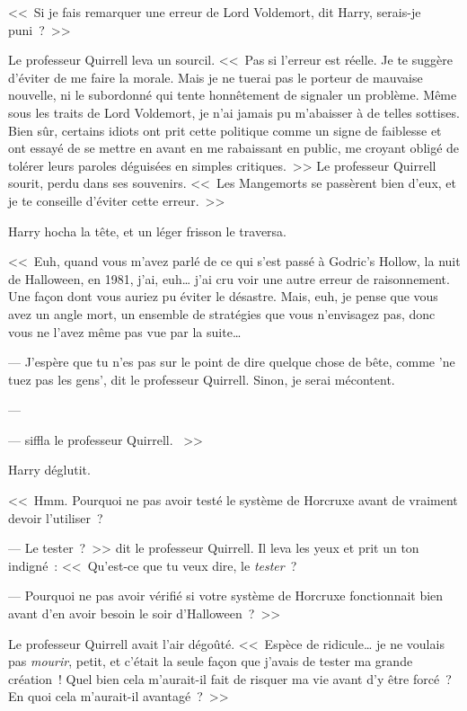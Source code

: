 <<~Si je fais remarquer une erreur de Lord Voldemort, dit Harry, serais-je puni~?~>>

Le professeur Quirrell leva un sourcil. <<~Pas si l'erreur est réelle. Je te suggère d'éviter de me faire la morale. Mais je ne tuerai pas le porteur de mauvaise nouvelle, ni le subordonné qui tente honnêtement de signaler un problème. Même sous les traits de Lord Voldemort, je n'ai jamais pu m'abaisser à de telles sottises. Bien sûr, certains idiots ont prit cette politique comme un signe de faiblesse et ont essayé de se mettre en avant en me rabaissant en public, me croyant obligé de tolérer leurs paroles déguisées en simples critiques.~>> Le professeur Quirrell sourit, perdu dans ses souvenirs. <<~Les Mangemorts se passèrent bien d'eux, et je te conseille d'éviter cette erreur.~>>

Harry hocha la tête, et un léger frisson le traversa.

<<~Euh, quand vous m'avez parlé de ce qui s'est passé à Godric's Hollow, la nuit de Halloween, en 1981, j'ai, euh… j'ai cru voir une autre erreur de raisonnement. Une façon dont vous auriez pu éviter le désastre. Mais, euh, je pense que vous avez un angle mort, un ensemble de stratégies que vous n'envisagez pas, donc vous ne l'avez même pas vue par la suite…

--- J'espère que tu n'es pas sur le point de dire quelque chose de bête, comme 'ne tuez pas les gens', dit le professeur Quirrell. Sinon, je serai mécontent.

--- 

---  siffla le professeur Quirrell. ~>>

Harry déglutit.

<<~Hmm. Pourquoi ne pas avoir testé le système de Horcruxe avant de vraiment devoir l'utiliser~?

--- Le tester~?~>> dit le professeur Quirrell. Il leva les yeux et prit un ton indigné~: <<~Qu'est-ce que tu veux dire, le \emph{tester}~?

--- Pourquoi ne pas avoir vérifié si votre système de Horcruxe fonctionnait bien avant d'en avoir besoin le soir d'Halloween~?~>>

Le professeur Quirrell avait l'air dégoûté. <<~Espèce de ridicule… je ne voulais pas \emph{mourir}, petit, et c'était la seule façon que j'avais de tester ma grande création~! Quel bien cela m'aurait-il fait de risquer ma vie avant d'y être forcé~? En quoi cela m'aurait-il avantagé~?~>>

